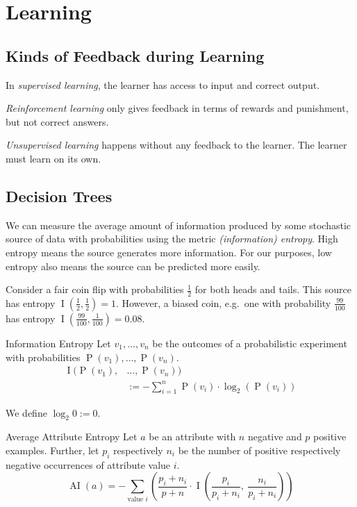 \documentclass[english]{panikzettel}
\begin{document}
\section{Learning}
\subsection{Kinds of Feedback during Learning}

In \emph{supervised learning}, the learner has access to input and correct output.

\emph{Reinforcement learning} only gives feedback in terms of rewards and punishment, but not correct answers.

\emph{Unsupervised learning} happens without any feedback to the learner. The learner must learn on its own.
\vspace{-0.5\baselineskip}
\subsection{Decision Trees}

\begin{halfboxl}
We can measure the average amount of information produced by some stochastic source of data with probabilities using the metric \emph{(information) entropy}.
High entropy means the source generates more information.
For our purposes, low entropy also means the source can be predicted more easily.

Consider a fair coin flip with probabilities $\frac{1}{2}$ for both heads and tails.
This source has entropy $\operatorname I(\frac{1}{2}, \frac{1}{2}) = 1$.
However, a biased coin, e.g.\ one with probability $\frac{99}{100}$ has entropy $\operatorname I (\frac {99}{100},\frac 1 {100}) = 0.08$.
\end{halfboxl}%
\begin{halfboxr}
\vspace{-\baselineskip}
\begin{defi}{Information Entropy}
Let $v_1,\ldots,v_n$ be the outcomes of a probabilistic experiment with probabilities $\operatorname P(v_1),\dots,\operatorname P(v_n)$.
\begin{align*}
\operatorname I(\operatorname P(v_1),&\dots,\operatorname P(v_n)) \\
&:= -\sum\limits_{i=1}^n \operatorname{P} (v_i) \cdot \log_2 (\operatorname{P}(v_i))
\end{align*}

{\footnotesize We define $\log_2 0 := 0$.}
\end{defi}
\end{halfboxr}
\vspace{-0.5\baselineskip}
\begin{defi}{Average Attribute Entropy}
Let $a$ be an attribute with $n$ negative and $p$ positive examples.
Further, let $p_i$ respectively $n_i$ be the number of positive respectively negative occurrences of attribute value $i$.
\[\operatorname{AI} (a) = - \sum\limits_\text{value $i$} \left (\frac{p_i + n_i}{p+n} \cdot \operatorname{I} \left ( \frac{p_i}{p_i+n_i},~ \frac{n_i}{p_i+n_i} \right) \right )\]
\end{defi}
\end{document}
